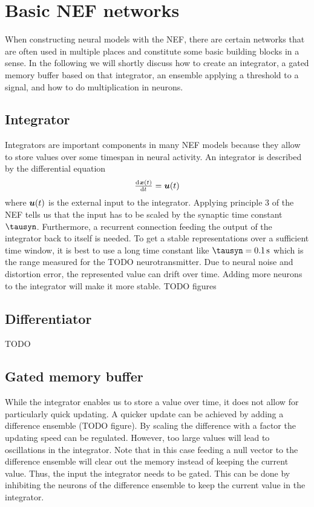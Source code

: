 \chapter{Basic NEF networks}
When constructing neural models with the NEF, there are certain networks that are often used in multiple places and constitute some basic building blocks in a sense.
In the following we will shortly discuss how to create an integrator, a gated memory buffer based on that integrator, an ensemble applying a threshold to a signal, and how to do multiplication in neurons.

\section{Integrator}
Integrators are important components in many NEF models because they allow to store values over some timespan in neural activity.
An integrator is described by the differential equation
\begin{equation}
    \od{\vc x(t)}{t} = \vc u(t)
\end{equation}
where $\bm{u}(t)$ is the external input to the integrator.
Applying principle 3 of the NEF tells us that the input has to be scaled by the synaptic time constant $\tausyn$.
Furthermore, a recurrent connection feeding the output of the integrator back to itself is needed.
To get a stable representations over a sufficient time window, it is best to use a long time constant like $\tausyn = \SI{0.1}{\second}$ which is the range measured for the TODO neurotransmitter.
Due to neural noise and distortion error, the represented value can drift over time.
Adding more neurons to the integrator will make it more stable.
TODO figures


\section{Differentiator}
TODO


\section{Gated memory buffer}
While the integrator enables us to store a value over time, it does not allow for particularly quick updating.
A quicker update can be achieved by adding a difference ensemble (TODO figure).
By scaling the difference with a factor the updating speed can be regulated.
However, too large values will lead to oscillations in the integrator.
Note that in this case feeding a null vector to the difference ensemble will clear out the memory instead of keeping the current value.
Thus, the input the integrator needs to be gated.
This can be done by inhibiting the neurons of the difference ensemble to keep the current value in the integrator.

